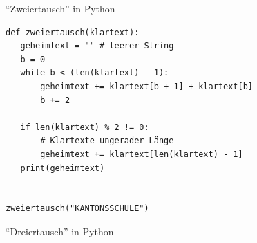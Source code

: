 \begin{frame}[fragile, label=sol22]{\enquote{Zweiertausch} in Python }
\begin{lstlisting}
def zweiertausch(klartext):
   geheimtext = "" # leerer String
   b = 0
   while b < (len(klartext) - 1):
       geheimtext += klartext[b + 1] + klartext[b]
       b += 2

   if len(klartext) % 2 != 0:
       # Klartexte ungerader Länge
       geheimtext += klartext[len(klartext) - 1]
   print(geheimtext)


zweiertausch("KANTONSSCHULE")
\end{lstlisting}
\end{frame}

\begin{frame}[label=python2]{\enquote{Dreiertausch} in Python }
\end{frame}


